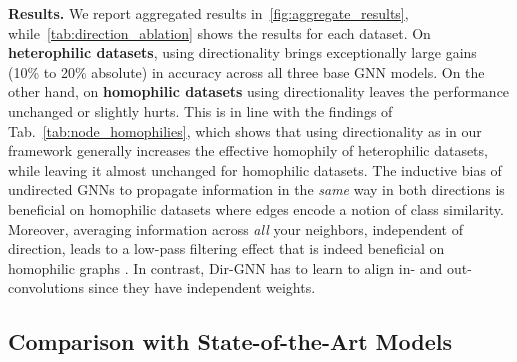 \documentclass{article}
\newcommand\oursacro{Dir-GNN}
\theoremstyle{plain}
\theoremstyle{definition}
\theoremstyle{remark}
\begin{document}
\textbf{Results.} We report aggregated results in~\cref{fig:aggregate_results}, while~\cref{tab:direction_ablation} shows the results for each dataset. On \textbf{heterophilic datasets}, using directionality brings exceptionally large gains (10\% to 20\% absolute) in accuracy across all three base GNN models. On the other hand, on \textbf{homophilic datasets} using directionality leaves the performance unchanged or slightly hurts. This is in line with the findings of Tab.~\ref{tab:node_homophilies}, which shows that using directionality as in our framework generally increases the effective homophily of heterophilic datasets, while leaving it almost unchanged for homophilic datasets. 
The inductive bias of undirected GNNs to propagate information in the \emph{same} way in both directions is beneficial on homophilic datasets where edges encode a notion of class similarity. Moreover, averaging information across {\em all} your neighbors, independent of direction, leads to a low-pass filtering effect that is indeed beneficial on homophilic graphs \cite{nt2019revisiting}. In contrast, \oursacro{} has to learn to align in- and out-convolutions since they have independent weights.



\subsection{Comparison with State-of-the-Art Models}
\label{sec:experiments_sota}
\end{document}
